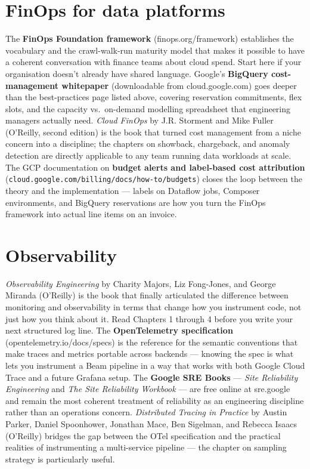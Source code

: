 \documentclass[
  11pt,
  british,
  oneside]{book}
\begin{document}
\hypertarget{finops-for-data-platforms}{%
\section{FinOps for data platforms}\label{finops-for-data-platforms}}

The \textbf{FinOps Foundation framework} (finops.org/framework)
establishes the vocabulary and the crawl-walk-run maturity model that
makes it possible to have a coherent conversation with finance teams
about cloud spend. Start here if your organisation doesn't already have
shared language. Google's \textbf{BigQuery cost-management whitepaper}
(downloadable from cloud.google.com) goes deeper than the best-practices
page listed above, covering reservation commitments, flex slots, and the
capacity vs.~on-demand modelling spreadsheet that engineering managers
actually need. \emph{Cloud FinOps} by J.R. Storment and Mike Fuller
(O'Reilly, second edition) is the book that turned cost management from
a niche concern into a discipline; the chapters on showback, chargeback,
and anomaly detection are directly applicable to any team running data
workloads at scale. The GCP documentation on \textbf{budget alerts and
label-based cost attribution}
(\texttt{cloud.google.com/billing/docs/how-to/budgets}) closes the loop
between the theory and the implementation --- labels on Dataflow jobs,
Composer environments, and BigQuery reservations are how you turn the
FinOps framework into actual line items on an invoice.

\hypertarget{observability}{%
\section{Observability}\label{observability}}

\emph{Observability Engineering} by Charity Majors, Liz Fong-Jones, and
George Miranda (O'Reilly) is the book that finally articulated the
difference between monitoring and observability in terms that change how
you instrument code, not just how you think about it. Read Chapters 1
through 4 before you write your next structured log line. The
\textbf{OpenTelemetry specification} (opentelemetry.io/docs/specs) is
the reference for the semantic conventions that make traces and metrics
portable across backends --- knowing the spec is what lets you
instrument a Beam pipeline in a way that works with both Google Cloud
Trace and a future Grafana setup. The \textbf{Google SRE Books} ---
\emph{Site Reliability Engineering} and \emph{The Site Reliability
Workbook} --- are free online at sre.google and remain the most coherent
treatment of reliability as an engineering discipline rather than an
operations concern. \emph{Distributed Tracing in Practice} by Austin
Parker, Daniel Spoonhower, Jonathan Mace, Ben Sigelman, and Rebecca
Isaacs (O'Reilly) bridges the gap between the OTel specification and the
practical realities of instrumenting a multi-service pipeline --- the
chapter on sampling strategy is particularly useful.
\end{document}
